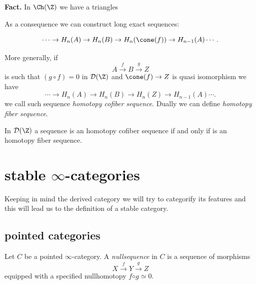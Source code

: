 \textbf{Fact.} In $\Ch(\Z)$ we have a triangles 

    \begin{center}
    \end{center}

      As a consequence we can construct long exact sequences:

    \[\cdots\to H_n(A)\to H_n(B)\to H_n(\cone(f))\to H_{n-1}(A)\cdots.\]

    More generally, if 
    \[A \overset{f}{\to} B\overset{g}{\to} Z\]
    is such that $(g\circ f)=0$ in $\mathcal{D}(\Z)$ and $\cone(f)\to Z$ is quasi isomorphism we have 
    \[\cdots\to H_n(A)\to H_n(B)\to H_n(Z)\to H_{n-1}(A)\cdots.\]
    we call such sequence \emph{homotopy cofiber sequence}. Dually we can define \emph{homotopy fiber sequence}.

    
    \begin{proposition}
    \label{stability_derived_cat}
        In $\mathcal{D}(\Z)$
        a sequence is an homotopy cofiber sequence if and only if is an homotopy fiber sequence.
    \end{proposition}



    \section{stable $\infty$-categories}
    Keeping in mind the derived category we will try to categorify its features and this will lead us to the definition of a stable category. 

    \subsection{pointed categories}
    \begin{definition}
Let $C$ be a pointed $\infty$-category. A \emph{nullsequence} in
$C$ is a sequence of morphisms
\[X\overset{f}{\to}Y\overset{g}{\to} Z\]
equipped with a specified nullhomotopy $f◦g\simeq 0$.  
\end{definition}

